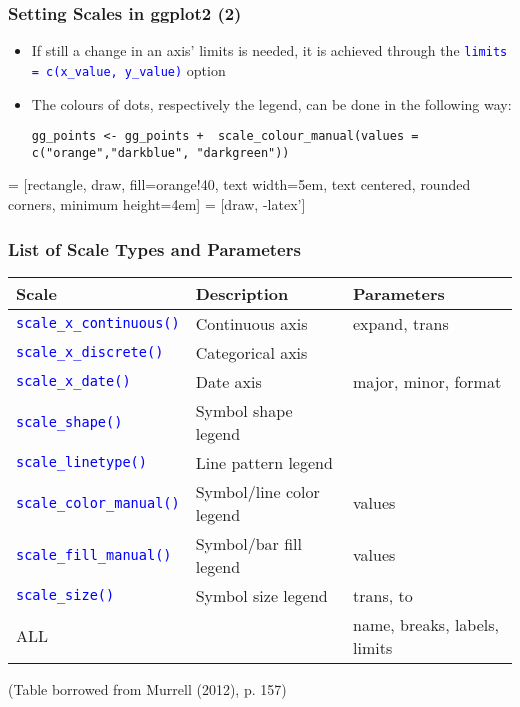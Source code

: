 \documentclass[10pt]{beamer}
\newcommand{\cc}[1]{\texttt{\textcolor{blue}{#1}}}
\theoremstyle{definition}
\begin{document}
\begin{frame}[fragile]
\frametitle{Setting Scales in \textbf{ggplot2} (2)}
\begin{itemize}
	\item If still a change in an axis' limits is needed, it is achieved through the \cc{limits = c(x\_value, y\_value)} option
	\item The colours of dots, respectively the legend, can be done in the following way:
	\begin{lstlisting}[style = rstyle, breaklines]
	gg_points <- gg_points +  scale_colour_manual(values = c("orange","darkblue", "darkgreen"))
	\end{lstlisting}
\end{itemize}

 = [rectangle, draw, fill=orange!40, 
    text width=5em, text centered, rounded corners, minimum height=4em]
 = [draw, -latex']
\begin{center}
\end{center}
\end{frame}

\begin{frame}[fragile]
\frametitle{List of Scale Types and Parameters}
\begin{small}
\begin{tabular}{lll}
	Scale & Description & Parameters\\
	\hline
	\cc{scale\_x\_continuous()} & Continuous axis & expand, trans\\
	\cc{scale\_x\_discrete()} & Categorical axis\\
	\cc{scale\_x\_date()} & Date axis & major, minor, format\\
	\cc{scale\_shape()} & Symbol shape legend\\
	\cc{scale\_linetype()} & Line pattern legend\\
	\cc{scale\_color\_manual()} & Symbol/line color legend & values\\
	\cc{scale\_fill\_manual()} & Symbol/bar fill legend & values\\
	\cc{scale\_size()} & Symbol size legend & trans, to\\
	ALL & &	 name, breaks, labels, limits\\
	\hline
\end{tabular}
\end{small}
(Table borrowed from Murrell (2012), p. 157)
\end{frame}
\end{document}
